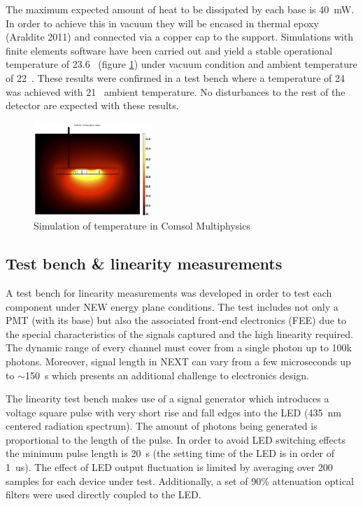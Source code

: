 \documentclass[a4paper, 10pt, oneside, twocolumn, 3p]{elsarticle}
\begin{document}
\par The maximum expected amount of heat to be dissipated by each base is 40~mW. In order to achieve this in vacuum they will be encased in thermal epoxy (Araldite 2011\textregistered) and connected via a copper cap to the support. Simulations with finite elements software have been carried out and yield a stable operational temperature of 23.6~ (figure \ref{fig:temp_simu}) under vacuum condition and ambient temperature of 22~. These results were confirmed in a test bench where a temperature of 24~ was achieved with 21~ ambient temperature. No disturbances to the rest of the detector are expected with these results. 
 
 
\begin{figure}
  \begin{center}
    \includegraphics[width=0.4\textwidth]{./figures/temp_simulation.png}
    \caption{Simulation of temperature in Comsol Multiphysics}
    \label{fig:temp_simu}
  \end{center}
\end{figure}

\subsection {Test bench \& linearity measurements}

\par A test bench for linearity measurements was developed in order to test each component under NEW energy plane conditions. The test includes not only a PMT (with its base) but also the associated front-end electronics (FEE) due to the special characteristics of the signals captured and the high linearity required.  The dynamic range of every channel must cover from a single photon up to 100k photons. Moreover, signal length in NEXT can vary from a few microseconds up to $\sim$150~\textmu s which presents an additional challenge to electronics design.

\par The linearity test bench makes use of a signal generator which introduces a voltage square pulse with very short rise and fall edges into the LED (435~nm centered radiation spectrum). The amount of photons being generated is proportional to the length of the pulse. In order to avoid LED switching effects the minimum pulse length is 20~\textmu s (the setting time of the LED is in order of 1~us). The effect of LED output fluctuation is limited by averaging over 200 samples for each device under test. Additionally, a set of 90\% attenuation optical filters were used directly coupled to the LED.
\end{document}
